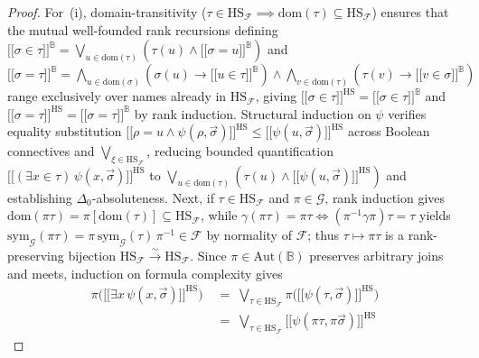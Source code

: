 \documentclass[10pt,twoside,openright]{book}
\providecommand{\llbracket}{\mathopen{[\![}}
\providecommand{\rrbracket}{\mathclose{]\!]}}
\theoremstyle{crmplain}
\theoremstyle{crmdef}
\theoremstyle{crmremark}
\begin{document}
\begin{proof}
For~(i), domain-transitivity ($\tau \in \mathrm{HS}_{\mathcal{F}} \implies \mathrm{dom}(\tau) \subseteq \mathrm{HS}_{\mathcal{F}}$) ensures that the mutual well-founded rank recursions defining $\llbracket \sigma \in \tau \rrbracket^{\mathbb{B}} = \bigvee_{u \in \mathrm{dom}(\tau)} (\tau(u) \wedge \llbracket \sigma = u \rrbracket^{\mathbb{B}})$ and $\llbracket \sigma = \tau \rrbracket^{\mathbb{B}} = \bigwedge_{u \in \mathrm{dom}(\sigma)} (\sigma(u) \to \llbracket u \in \tau \rrbracket^{\mathbb{B}}) \wedge \bigwedge_{v \in \mathrm{dom}(\tau)} (\tau(v) \to \llbracket v \in \sigma \rrbracket^{\mathbb{B}})$ range exclusively over names already in $\mathrm{HS}_{\mathcal{F}}$, giving $\llbracket \sigma \in \tau \rrbracket^{\mathrm{HS}} = \llbracket \sigma \in \tau \rrbracket^{\mathbb{B}}$ and $\llbracket \sigma = \tau \rrbracket^{\mathrm{HS}} = \llbracket \sigma = \tau \rrbracket^{\mathbb{B}}$ by rank induction. Structural induction on $\psi$ verifies equality substitution $\llbracket \rho = u \wedge \psi(\rho, \vec{\sigma}) \rrbracket^{\mathrm{HS}} \le \llbracket \psi(u, \vec{\sigma}) \rrbracket^{\mathrm{HS}}$ across Boolean connectives and $\bigvee_{\xi \in \mathrm{HS}_{\mathcal{F}}}$, reducing bounded quantification $\llbracket (\exists x \in \tau)\,\psi(x, \vec{\sigma}) \rrbracket^{\mathrm{HS}}$ to $\bigvee_{u \in \mathrm{dom}(\tau)} (\tau(u) \wedge \llbracket \psi(u, \vec{\sigma}) \rrbracket^{\mathrm{HS}})$ and establishing $\Delta_0$-absoluteness. Next, if $\tau \in \mathrm{HS}_{\mathcal{F}}$ and $\pi \in \mathcal{G}$, rank induction gives $\mathrm{dom}(\pi\tau) = \pi[\mathrm{dom}(\tau)] \subseteq \mathrm{HS}_{\mathcal{F}}$, while $\gamma(\pi\tau) = \pi\tau \iff (\pi^{-1}\gamma\pi)\tau = \tau$ yields $\mathrm{sym}_{\mathcal{G}}(\pi\tau) = \pi\,\mathrm{sym}_{\mathcal{G}}(\tau)\,\pi^{-1} \in \mathcal{F}$ by normality of $\mathcal{F}$; thus $\tau \mapsto \pi\tau$ is a rank-preserving bijection $\mathrm{HS}_{\mathcal{F}} \xrightarrow{\sim} \mathrm{HS}_{\mathcal{F}}$. Since $\pi \in \mathrm{Aut}(\mathbb{B})$ preserves arbitrary joins and meets, induction on formula complexity gives
\[
  \begin{aligned}
    \pi\bigl(\llbracket \exists x\,\psi(x, \vec{\sigma}) \rrbracket^{\mathrm{HS}}\bigr)
    &\;=\; \bigvee_{\tau \in \mathrm{HS}_{\mathcal{F}}} \pi\bigl(\llbracket \psi(\tau, \vec{\sigma}) \rrbracket^{\mathrm{HS}}\bigr) \\
    &\;=\; \bigvee_{\tau \in \mathrm{HS}_{\mathcal{F}}} \llbracket \psi(\pi\tau, \pi\vec{\sigma}) \rrbracket^{\mathrm{HS}}

\end{aligned}\]
\end{proof}
\end{document}
